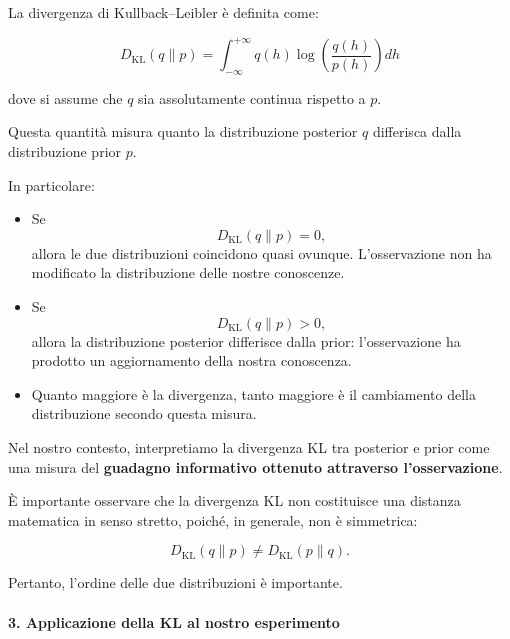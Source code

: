 La divergenza di Kullback--Leibler è definita come:

\begin{equation*}
    \boxed{
    D_{\mathrm{KL}}(q\|p)
    =
    \int_{-\infty}^{+\infty}
    q(h)
    \log\left(
        \frac{q(h)}{p(h)}
    \right)dh
    }
\end{equation*}

dove si assume che $q$ sia assolutamente continua rispetto a $p$.

Questa quantità misura quanto la distribuzione posterior $q$ differisca dalla distribuzione prior $p$.

In particolare:

\begin{itemize}
    \item Se
    \begin{equation*}
        D_{\mathrm{KL}}(q\|p)=0,
    \end{equation*}
    allora le due distribuzioni coincidono quasi ovunque. L'osservazione non ha modificato la distribuzione delle nostre conoscenze.

    \item Se
    \begin{equation*}
        D_{\mathrm{KL}}(q\|p)>0,
    \end{equation*}
    allora la distribuzione posterior differisce dalla prior: l'osservazione ha prodotto un aggiornamento della nostra conoscenza.

    \item Quanto maggiore è la divergenza, tanto maggiore è il cambiamento della distribuzione secondo questa misura.
\end{itemize}

Nel nostro contesto, interpretiamo la divergenza KL tra posterior e prior come una misura del \textbf{guadagno informativo ottenuto attraverso l'osservazione}.

È importante osservare che la divergenza KL non costituisce una distanza matematica in senso stretto, poiché, in generale, non è simmetrica:

\begin{equation*}
    D_{\mathrm{KL}}(q\|p)
    \neq
    D_{\mathrm{KL}}(p\|q).
\end{equation*}

Pertanto, l'ordine delle due distribuzioni è importante.

\paragraph{3. Applicazione della KL al nostro esperimento}

